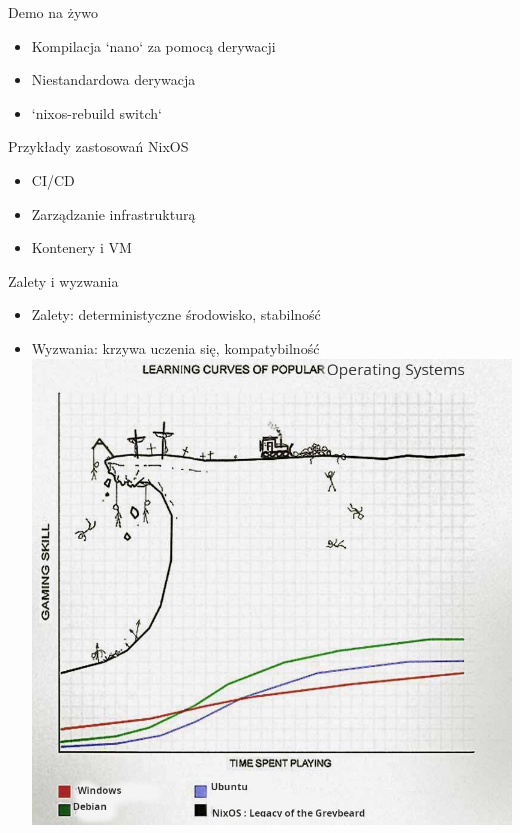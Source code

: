 \documentclass{beamer}
\begin{document}
\begin{frame}{Demo na żywo}
    \begin{itemize}
        \item Kompilacja `nano` za pomocą derywacji
        \item Niestandardowa derywacja
        \item `nixos-rebuild switch`
    \end{itemize}
\end{frame}

\begin{frame}{Przykłady zastosowań NixOS}
    \begin{itemize}
        \item CI/CD
        \item Zarządzanie infrastrukturą
        \item Kontenery i VM
    \end{itemize}
\end{frame}

\begin{frame}{Zalety i wyzwania}
    \begin{itemize}
        \item Zalety: deterministyczne środowisko, stabilność
        \item Wyzwania: krzywa uczenia się, kompatybilność
        \includegraphics{ assets/nixoscurve.jpg}

    \end{itemize}
\end{frame}
\end{document}
